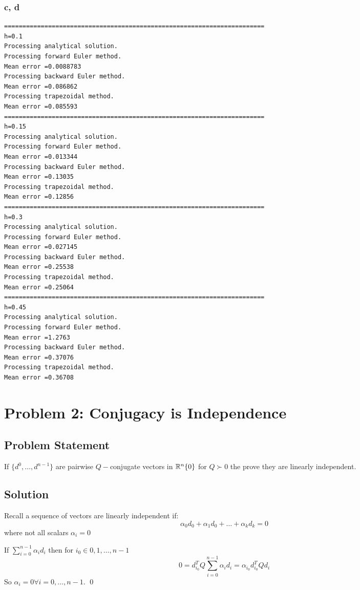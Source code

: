 \documentclass[11pt]{report}
\theoremstyle{definition}
\begin{document}
\subsubsection*{c, d}

\begin{lstlisting}[basicstyle=\small]
=======================================================================
h=0.1
Processing analytical solution.
Processing forward Euler method.
Mean error =0.0088783
Processing backward Euler method.
Mean error =0.086862
Processing trapezoidal method.
Mean error =0.085593
=======================================================================
h=0.15
Processing analytical solution.
Processing forward Euler method.
Mean error =0.013344
Processing backward Euler method.
Mean error =0.13035
Processing trapezoidal method.
Mean error =0.12856
=======================================================================
h=0.3
Processing analytical solution.
Processing forward Euler method.
Mean error =0.027145
Processing backward Euler method.
Mean error =0.25538
Processing trapezoidal method.
Mean error =0.25064
=======================================================================
h=0.45
Processing analytical solution.
Processing forward Euler method.
Mean error =1.2763
Processing backward Euler method.
Mean error =0.37076
Processing trapezoidal method.
Mean error =0.36708
\end{lstlisting}


\newpage
\section*{Problem 2: Conjugacy is Independence}
\subsection*{Problem Statement}
If $\{d^0,\ldots,d^{n-1}\}$ are pairwise $Q-$conjugate vectors in $\mathbb{R}^n\\\{0\}$
for $Q\succ0$ the prove they are linearly independent.

\subsection*{Solution}
Recall a sequence of vectors are linearly independent if:
\[\alpha_0d_0+\alpha_1d_0+\ldots+\alpha_kd_k=0\]
where not all scalars $\alpha_i=0$

If $\sum_{i=0}^{n-1}\alpha_i d_i$ then for $i_0\in{0,1,\ldots,n-1}$
\[ 0 = d^T_{i_0}Q\sum_{i=0}^{n-1}\alpha_i d_i = \alpha_{i_0}d_{i_0}^TQd_i \]
So $\alpha_i=0\forall i=0,\ldots,n-1$.
\qed
\end{document}
